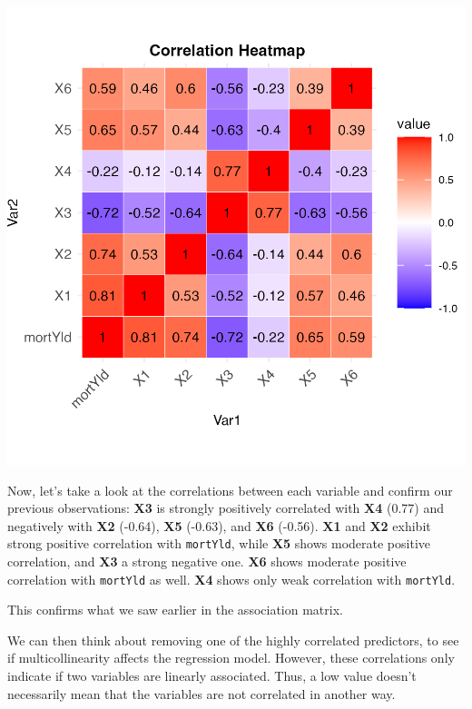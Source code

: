 \documentclass[
  11pt,
]{article}
\begin{document}
\begin{minipage}{0.4\textwidth}
\includegraphics[width=\linewidth]{correlation_heatmap.png}
\end{minipage}
\hfill
\begin{minipage}{0.6\textwidth}
\vspace{0.5em}
\small
Now, let's take a look at the correlations between each variable and confirm our previous observations:
\textbf{X3} is strongly positively correlated with \textbf{X4} (0.77) and negatively with \textbf{X2} (-0.64), \textbf{X5} (-0.63), and \textbf{X6} (-0.56).
\textbf{X1} and \textbf{X2} exhibit strong positive correlation with \texttt{mortYld}, while \textbf{X5} shows moderate positive correlation, and \textbf{X3} a strong negative one. \textbf{X6} shows moderate positive correlation with \texttt{mortYld} as well. \textbf{X4} shows only weak correlation with \texttt{mortYld}.


This confirms what we saw earlier in the association matrix.

We can then think about removing one of the highly correlated
predictors, to see if multicollinearity affects the regression model.
However, these correlations only indicate if two variables are linearly
associated. Thus, a low value doesn't necessarily mean that the
variables are not correlated in another way.
\end{minipage}
\end{document}
